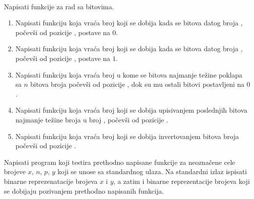 \begin{Answer}[ref=1_07]
\\
\end{Answer}


\begin{Exercise}[label=1_08]
Napisati funkcije za rad sa bitovima. 
\begin{enumerate}
\item Napisati funkciju  koja vraća broj koji se dobija kada se  bitova datog broja , počevši od pozicije , postave na $0$.
\item Napisati funkciju  koja vraća broj koji se dobija kada se  bitova datog broja , počevši od pozicije , postave na $1$.
\item %
Napisati funkciju  koja vraća broj u kome se  bitova najmanje težine poklapa sa $n$ bitova broja  počevši od pozicije , dok su mu ostali bitovi postavljeni na $0$.
\item %
Napisati funkciju  koja vraća broj koji se dobija upisivanjem poslednjih  bitova najmanje težine broja  u broj , počevši od pozicije .
\item Napisati funkciju  koja vraća broj koji se dobija invertovanjem  bitova broja  počevši od pozicije . 
\end{enumerate}
Napisati program koji testira prethodno napisane funkcije za neoznačene cele brojeve $x$, $n$, $p$, $y$ koji se unose sa standardnog ulaza. Na standardni izlaz ispisati binarne reprezenatacije brojeva $x$ i $y$, a zatim i binarne reprezentacije brojeva koji se dobijaju pozivanjem prethodno napisanih funkcija. 


\end{Exercise}
